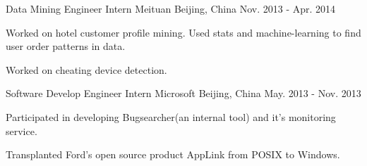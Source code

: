 \begin{cventries}
  \cventry
    {Data Mining Engineer Intern}
    {Meituan}
    {Beijing, China}
    {Nov. 2013 - Apr. 2014}
    {
      \begin{cvitems}
        \item {Worked on hotel customer profile mining. Used stats and machine-learning to find user order patterns in data.}
        \item {Worked on cheating device detection.}
      \end{cvitems}
    }

  \cventry
    {Software Develop Engineer Intern}
    {Microsoft}
    {Beijing, China}
    {May. 2013 - Nov. 2013}
    {
      \begin{cvitems}
        \item {Participated in developing Bugsearcher(an internal tool) and it’s monitoring service.}
        \item {Transplanted Ford’s open source product AppLink from POSIX to Windows.}
      \end{cvitems}
    }

\end{cventries}
